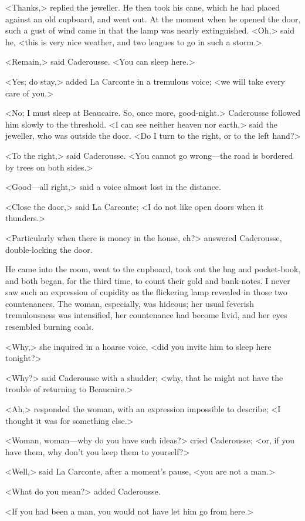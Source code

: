 {<Thanks,> replied the jeweller. He then took his cane, which he had placed against an old cupboard, and went out. At the moment when he opened the door, such a gust of wind came in that the lamp was nearly extinguished. <Oh,> said he, <this is very nice weather, and two leagues to go in such a storm.> 

<Remain,> said Caderousse. <You can sleep here.> 

<Yes; do stay,> added La Carconte in a tremulous voice; <we will take every care of you.> 

<No; I must sleep at Beaucaire. So, once more, good-night.> Caderousse followed him slowly to the threshold. <I can see neither heaven nor earth,> said the jeweller, who was outside the door. <Do I turn to the right, or to the left hand?> 

<To the right,> said Caderousse. <You cannot go wrong—the road is bordered by trees on both sides.> 

<Good—all right,> said a voice almost lost in the distance. 

<Close the door,> said La Carconte; <I do not like open doors when it thunders.> 

<Particularly when there is money in the house, eh?> answered Caderousse, double-locking the door.  

He came into the room, went to the cupboard, took out the bag and pocket-book, and both began, for the third time, to count their gold and bank-notes. I never saw such an expression of cupidity as the flickering lamp revealed in those two countenances. The woman, especially, was hideous; her usual feverish tremulousness was intensified, her countenance had become livid, and her eyes resembled burning coals. 

<Why,> she inquired in a hoarse voice, <did you invite him to sleep here tonight?> 

<Why?> said Caderousse with a shudder; <why, that he might not have the trouble of returning to Beaucaire.> 

<Ah,> responded the woman, with an expression impossible to describe; <I thought it was for something else.> 

<Woman, woman—why do you have such ideas?> cried Caderousse; <or, if you have them, why don't you keep them to yourself?> 

<Well,> said La Carconte, after a moment's pause, <you are not a man.> 

<What do you mean?> added Caderousse. 

<If you had been a man, you would not have let him go from here.> 

}
